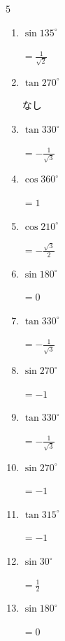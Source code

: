 \begin{multicols}{5}
\begin{enumerate}
  \item $\displaystyle \sin{135^\circ}$

        $\displaystyle =\frac{1}{\sqrt{2}}$

  \item $\displaystyle \tan{270^\circ}$

        $\displaystyle なし$

  \item $\displaystyle \tan{330^\circ}$

        $\displaystyle =-\frac{1}{\sqrt{3}}$

  \item $\displaystyle \cos{360^\circ}$

        $\displaystyle =1$

  \item $\displaystyle \cos{210^\circ}$

        $\displaystyle =-\frac{\sqrt{3}}{2}$

  \item $\displaystyle \sin{180^\circ}$

        $\displaystyle =0$

\columnbreak %

  \item $\displaystyle \tan{330^\circ}$

        $\displaystyle =-\frac{1}{\sqrt{3}}$

  \item $\displaystyle \sin{270^\circ}$

        $\displaystyle =-1$

  \item $\displaystyle \tan{330^\circ}$

        $\displaystyle =-\frac{1}{\sqrt{3}}$

  \item $\displaystyle \sin{270^\circ}$

        $\displaystyle =-1$

  \item $\displaystyle \tan{315^\circ}$

        $\displaystyle =-1$

  \item $\displaystyle \sin{30^\circ}$

        $\displaystyle =\frac{1}{2}$

  \item $\displaystyle \sin{180^\circ}$

        $\displaystyle =0$


\end{enumerate}
\end{multicols}
